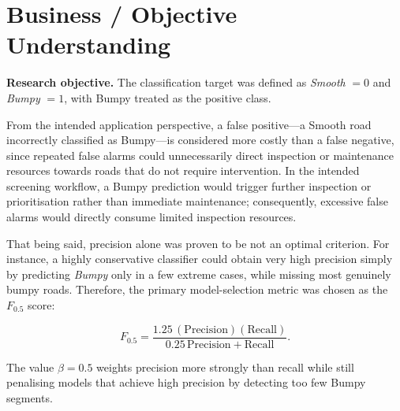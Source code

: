 \section{Business / Objective Understanding}
\label{sec:business-understanding}
\textbf{Research objective.}
The classification target was defined as \textit{Smooth} $=0$ and
\textit{Bumpy} $=1$, with Bumpy treated as the positive class.

From the intended application perspective, a false positive---a Smooth road incorrectly classified as Bumpy---is 
considered more costly than a false negative, since repeated false alarms could unnecessarily direct
inspection or maintenance resources towards roads that do not require intervention.
In the intended screening workflow, a Bumpy prediction would trigger further
inspection or prioritisation rather than immediate maintenance; consequently,
excessive false alarms would directly consume limited inspection resources.

That being said, precision alone was proven to be not an optimal criterion. For instance, a highly
conservative classifier could obtain very high precision simply by predicting \textit{Bumpy} only
in a few extreme cases, while missing most genuinely bumpy roads. Therefore,
the primary model-selection metric was chosen as the $F_{0.5}$ score:

\begin{equation}
F_{0.5}
=
\frac{1.25\,(\mathrm{Precision})(\mathrm{Recall})}
     {0.25\,\mathrm{Precision}+\mathrm{Recall}}.
\end{equation}

The value $\beta=0.5$ weights precision more strongly than recall while still penalising
models that achieve high precision by detecting too few Bumpy segments.
